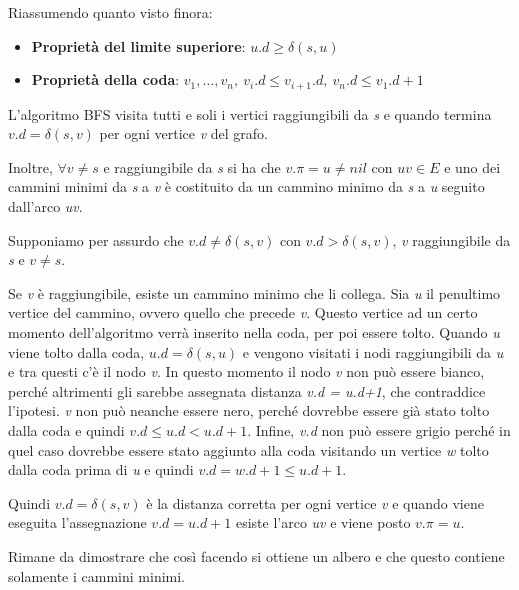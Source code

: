 

Riassumendo quanto visto finora:

\begin{itemize}
\item
  \textbf{Proprietà del limite superiore}: $u.d \geq \delta(s,u)$ 
\item
  \textbf{Proprietà della coda}: $v_1, \ldots, v_n, \: v_i.d \leq v_{i+1}.d, \: v_n.d \leq v_1.d+1$ 
\end{itemize}

L'algoritmo BFS visita tutti e soli i vertici raggiungibili da \emph{s} e
quando termina $v.d = \delta(s,v)$ per ogni vertice \emph{v} del
grafo.

Inoltre, $\forall v \neq s$ e raggiungibile da \emph{s} si ha che $v.\pi
= u \neq nil$ con $uv \in E$ e uno dei cammini minimi da \emph{s} a
\emph{v} è costituito da un cammino minimo da \emph{s} a \emph{u}
seguito dall'arco \emph{uv}.

Supponiamo per assurdo che $v.d \neq \delta(s,v)$ con $v.d > \delta(s,v)$, \emph{v} raggiungibile da \emph{s} e
$v\neq s$.

Se \emph{v} è raggiungibile, esiste un cammino minimo che li collega.
Sia \emph{u} il penultimo vertice del cammino, ovvero quello che precede
\emph{v}. Questo vertice ad un certo momento dell'algoritmo verrà
inserito nella coda, per poi essere tolto. Quando \emph{u} viene tolto
dalla coda, $u.d = \delta(s,u)$ e vengono visitati i nodi
raggiungibili da \emph{u} e tra questi c'è il nodo \emph{v}. In questo
momento il nodo \emph{v} non può essere bianco, perché altrimenti gli
sarebbe assegnata distanza \emph{v.d = u.d+1}, che contraddice
l'ipotesi. \emph{v} non può neanche essere nero, perché dovrebbe essere
già stato tolto dalla coda e quindi $v.d \leq u.d < u.d+1$. Infine, \emph{v.d} non può essere grigio perché in
quel caso dovrebbe essere stato aggiunto alla coda visitando un vertice
\emph{w} tolto dalla coda prima di \emph{u} e quindi $v.d = w.d+1
\leq u.d+1$.

Quindi $v.d = \delta(s,v)$ è la distanza corretta per ogni vertice
\emph{v} e quando viene eseguita l'assegnazione $v.d = u.d+1$
esiste l'arco \emph{uv} e viene posto $v.\pi = u$.

Rimane da dimostrare che così facendo si ottiene un albero e che questo
contiene solamente i cammini minimi.

